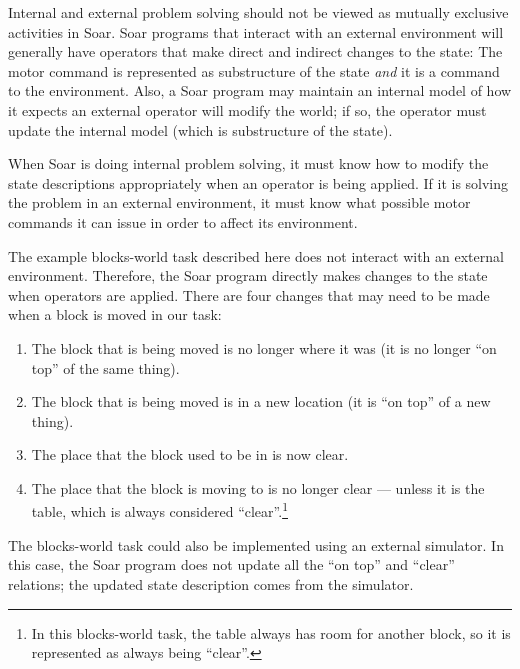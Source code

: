 Internal and external problem solving should not be viewed as mutually exclusive activities in Soar. Soar programs that interact with an external environment will generally have operators that make direct and indirect changes to the state: The motor command is represented as substructure of the state \emph{and} it is a command to the environment. Also, a Soar program may maintain an internal model of how it expects an external operator will modify the world; if so, the operator must update the internal model (which is substructure of the state).

When Soar is doing internal problem solving, it must know how to modify the state descriptions appropriately when an operator is being applied. If it is solving the problem in an external environment, it must know what possible motor commands it can issue in order to affect its environment.

The example blocks-world task described here does not interact with an external environment. Therefore, the Soar program directly makes changes to the state when operators are applied. There are four changes that may need to be made when a block is moved in our task: 

\vspace{-8pt}
\begin{enumerate}\label{LIST:blocks-app}
	\item The block that is being moved is no longer where it was (it is no longer ``on top'' of the same thing).
	\vspace{-6pt}
	\item The block that is being moved is in a new location (it is ``on top'' of a new thing).
	\vspace{-6pt}
	\item The place that the block used to be in is now clear.
	\vspace{-6pt}
	\item The place that the block is moving to is no longer clear --- unless it is the table, which is always considered ``clear''.\footnote{
		In this blocks-world task, the table always has room for another block, so it is represented as always being ``clear''.}
	\vspace{-6pt}
\end{enumerate}

The blocks-world task could also be implemented using an external simulator. In this case, the Soar program does not update all the ``on top'' and ``clear'' relations; the updated state description comes from the simulator.


